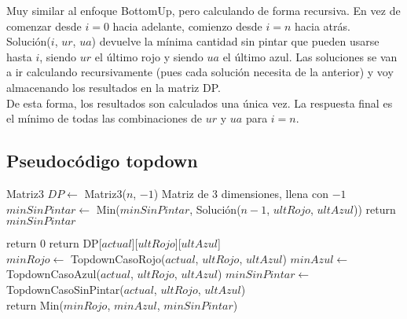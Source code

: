 Muy similar al enfoque BottomUp, pero calculando de forma recursiva. En vez de comenzar desde $i = 0$ hacia adelante, comienzo desde $i = n$ hacia atrás. \\

Solución($i$, $ur$, $ua$) devuelve la mínima cantidad sin pintar que pueden usarse hasta $i$, siendo $ur$ el último rojo y siendo $ua$ el último azul. Las soluciones se van a ir calculando recursivamente (pues cada solución necesita de la anterior) y voy almacenando los resultados en la matriz DP. \\

De esta forma, los resultados son calculados una única vez. La respuesta final es el mínimo de todas las combinaciones de $ur$ y $ua$ para $i = n$. \\


\subsection{Pseudocódigo topdown}

\begin{algorithm}[H]
\begin{algorithmic}
  \State Matriz3 $DP \gets$ Matriz3($n$, $-1$) \Comment Matriz de 3 dimensiones, llena con $-1$
            \State $minSinPintar \gets$ Min($minSinPintar$, Solución($n-1$, $ultRojo$, $ultAzul$))
        \EndFor
    \EndFor
    \State return $minSinPintar$
\EndProcedure
\end{algorithmic}
\end{algorithm} 


\begin{algorithm}[H]
\begin{algorithmic}
        return $0$
    \EndIf
        return DP[$actual$][$ultRojo$][$ultAzul$]
    \EndIf \\

    \State $minRojo \gets$ TopdownCasoRojo($actual$, $ultRojo$, $ultAzul$)
    \State $minAzul \gets$ TopdownCasoAzul($actual$, $ultRojo$, $ultAzul$)
    \State $minSinPintar \gets$ TopdownCasoSinPintar($actual$, $ultRojo$, $ultAzul$) \\

    \State return Min($minRojo$, $minAzul$, $minSinPintar$)
\EndProcedure
\end{algorithmic}
\end{algorithm} 


